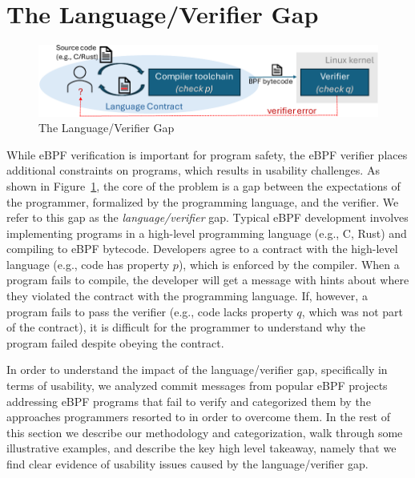 \section{The Language/Verifier Gap}
\label{sec:motivation}

\begin{figure}
    \includegraphics[width=1.0\linewidth]{figs/gap2-crop.pdf}
    \centering
    \vspace{-10pt}
    \caption{The Language/Verifier Gap}
    \label{fig:gap}
    \vspace{-10pt}
\end{figure}


While eBPF verification is important for program safety, the eBPF verifier
    places additional constraints on programs, which results in usability challenges.
As shown in Figure~\ref{fig:gap},
the core of the problem is a gap between the expectations of the programmer, formalized by the
programming language, and the verifier.  We refer to this gap as the {\em language/verifier} gap.
    Typical eBPF development involves implementing programs in a high-level
    programming language (e.g., C, Rust) and compiling to eBPF bytecode.
Developers agree to a contract with the high-level language (e.g., code has property $p$), which is
    enforced by the compiler.
When a program fails to compile, the developer will get a message with
    hints about where they violated
    the contract with the programming language.
    If, however, a program fails to pass the verifier (e.g., code lacks property $q$, which was not
    part of the contract),
    it is difficult for the programmer
    to understand why the program failed despite obeying the contract.

In order to understand the impact of the language/verifier gap, specifically in terms of usability,
we analyzed commit messages from popular eBPF projects
addressing eBPF programs that fail to verify
and categorized them by the
approaches programmers resorted to in order to overcome them.
In the rest of this section we describe our methodology and categorization, walk through some illustrative examples, and describe the key high level takeaway, namely that we find clear evidence of usability issues caused by the language/verifier gap.


